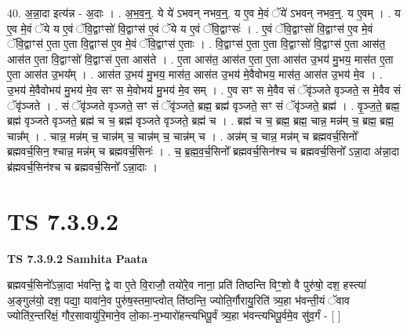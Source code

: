 \documentclass[17pt]{extarticle}
\begin{document}
40. अ॒न्ना॒दा इत्य॑न्न - अ॒दाः । . अ॒भ॒व॒न्॒. ये ये॑ ऽभवन् नभव॒न्॒. य ए॒व मे॒वं ॅये॑ ऽभवन् नभव॒न्॒. य ए॒वम् । . य ए॒व मे॒वं ॅये य ए॒वं ॅवि॒द्वाꣳसो॑ वि॒द्वाꣳस॑ ए॒वं ॅये य ए॒वं ॅवि॒द्वाꣳसः॑ । . ए॒वं ॅवि॒द्वाꣳसो॑ वि॒द्वाꣳस॑ ए॒व मे॒वं ॅवि॒द्वाꣳस॑ ए॒ता ए॒ता वि॒द्वाꣳस॑ ए॒व मे॒वं ॅवि॒द्वाꣳस॑ ए॒ताः । . वि॒द्वाꣳस॑ ए॒ता ए॒ता वि॒द्वाꣳसो॑ वि॒द्वाꣳस॑ ए॒ता आस॑त॒ आस॑त ए॒ता वि॒द्वाꣳसो॑ वि॒द्वाꣳस॑ ए॒ता आस॑ते । . ए॒ता आस॑त॒ आस॑त ए॒ता ए॒ता आस॑त उ॒भय॑ मु॒भय॒ मास॑त ए॒ता ए॒ता आस॑त उ॒भय᳚म् । . आस॑त उ॒भय॑ मु॒भय॒ मास॑त॒ आस॑त उ॒भय॑ मे॒वैवोभय॒ मास॑त॒ आस॑त उ॒भय॑ मे॒व । . उ॒भय॑ मे॒वैवोभय॑ मु॒भय॑ मे॒व सꣳ स मे॒वोभय॑ मु॒भय॑ मे॒व सम् । . ए॒व सꣳ स मे॒वैव सं ॅवृ॑ञ्जते वृञ्जते॒ स मे॒वैव सं ॅवृ॑ञ्जते । . सं ॅवृ॑ञ्जते वृञ्जते॒ सꣳ सं ॅवृ॑ञ्जते॒ ब्रह्म॒ ब्रह्म॑ वृञ्जते॒ सꣳ सं ॅवृ॑ञ्जते॒ ब्रह्म॑ । . वृ॒ञ्ज॒ते॒ ब्रह्म॒ ब्रह्म॑ वृञ्जते वृञ्जते॒ ब्रह्म॑ च च॒ ब्रह्म॑ वृञ्जते वृञ्जते॒ ब्रह्म॑ च । . ब्रह्म॑ च च॒ ब्रह्म॒ ब्रह्म॒ चान्न॒ मन्न॑म् च॒ ब्रह्म॒ ब्रह्म॒ चान्न᳚म् । . चान्न॒ मन्न॑म् च॒ चान्न॑म् च॒ चान्न॑म् च॒ चान्न॑म् च । . अन्न॑म् च॒ चान्न॒ मन्न॑म् च ब्रह्मवर्च॒सिनो᳚ ब्रह्मवर्च॒सिन॒ श्चान्न॒ मन्न॑म् च ब्रह्मवर्च॒सिनः॑ । . च॒ ब्र॒ह्म॒व॒र्च॒सिनो᳚ ब्रह्मवर्च॒सिन॑श्च च ब्रह्मवर्च॒सिनो᳚ ऽन्ना॒दा अ॑न्ना॒दा ब्र॑ह्मवर्च॒सिन॑श्च च ब्रह्मवर्च॒सिनो᳚ ऽन्ना॒दाः । \newline
\pagebreak
{}

\section{ TS 7.3.9.2 }

\textbf{TS 7.3.9.2 } \newline
\textbf{Samhita Paata} \newline

ब्रह्मवर्च॒सिनो᳚ऽन्ना॒दा भ॑वन्ति॒ द्वे वा ए॒ते वि॒राजौ॒ तयो॑रे॒व नाना॒ प्रति॑ तिष्ठन्ति विꣳ॒॒शो वै पुरु॑षो॒ दश॒ हस्त्या॑ अ॒ङ्गुल॑यो॒ दश॒ पद्या॒ यावा॑ने॒व पुरु॑ष॒स्तमा॒प्त्वोत् ति॑ष्ठन्ति॒ ज्योति॒र्गौरायु॒रिति॑ त्र्य॒हा भ॑वन्ती॒यं ॅवाव ज्योति॑र॒न्तरि॑क्षं॒ गौर॒सावायु॑रि॒माने॒व लो॒का-न॒भ्यारो॑हन्त्यभिपू॒र्वं त्र्य॒हा भ॑वन्त्यभिपू॒र्वमे॒व सु॑व॒र्गं - [  ] \newline
\end{document}
